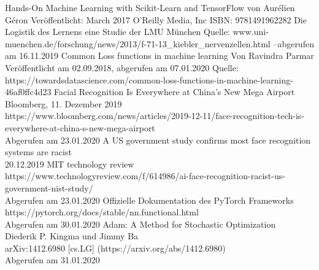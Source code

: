 \documentclass{article}
\begin{document}
\begin{thebibliography}{99}
	Hands-On Machine Learning with Scikit-Learn and TensorFlow\newline
	von Aurélien Géron\newline
	Veröffentlicht: March 2017 O'Reilly Media, Inc\newline
	ISBN: 9781491962282
	Die Logistik des Lernens eine Studie der LMU München\newline
	Quelle: www.uni-muenchen.de/forschung/news/2013/\newline f-71-13\_kiebler\_nervenzellen.html --abgerufen am 16.11.2019
	Common Loss functions in machine learning\newline
	Von Ravindra Parmar\newline
	Veröffentlicht am 02.09.2018, abgerufen am 07.01.2020\newline
	Quelle: https://towardsdatascience.com/common-loss-functions-in-machine-learning-46af0ffc4d23 
	Facial Recognition Is Everywhere at China’s New Mega Airport\\
	Bloomberg, 11. Dezember 2019\\
	https://www.bloomberg.com/news/articles/2019-12-11/face-recognition-tech-is-everywhere-at-china-s-new-mega-airport\\
	Abgerufen am 23.01.2020
	A US government study confirms most face recognition systems are racist\\
	20.12.2019 MIT technology review\\
	https://www.technologyreview.com/f/614986/ai-face-recognition-racist-us-government-nist-study/\\
	Abgerufen am 23.01.2020
	Offizielle Dokumentation des PyTorch Frameworks\\
	https://pytorch.org/docs/stable/nn.functional.html\\
	Abgerufen am 30.01.2020
	Adam: A Method for Stochastic Optimization\\
	Diederik P. Kingma und Jimmy Ba\\
	arXiv:1412.6980 [cs.LG] (https://arxiv.org/abs/1412.6980)\\
	Abgerufen am 31.01.2020
\end{thebibliography}
\listoffigures
\end{document}
